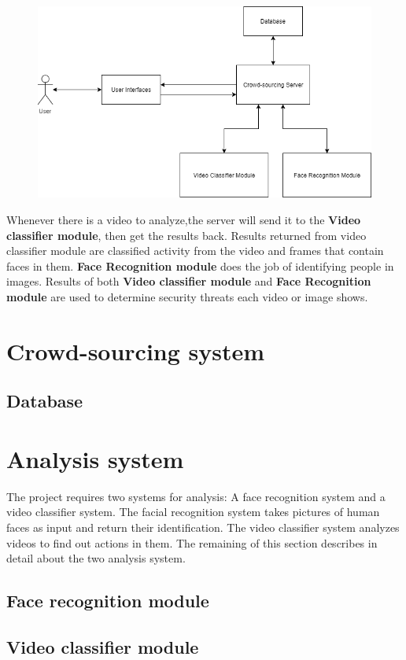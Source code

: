 \begin{center}
    \begin{figure}[H]
    \centering
    \includegraphics[width=1\columnwidth]{images/chap3/system_overview_basic.png}
    \label{chap3:system_overview_basic}
    \end{figure}
\end{center}
Whenever there is a video to analyze,the server will send it to the \textbf{Video classifier module}, then get the results back. Results returned from video classifier module are classified activity from the video and frames that contain faces in them. \textbf{Face Recognition module} does the job of identifying people in images. Results of both \textbf{Video classifier module} and \textbf{Face Recognition module} are used to determine security threats each video or image shows.
\section{Crowd-sourcing system}
\subsection{Database}
\section{Analysis system}
The project requires two systems for analysis: A face recognition system and a video classifier system. The facial recognition system takes pictures of human faces as input and return their identification. The video classifier system analyzes videos to find out actions in them. The remaining of this section describes in detail about the two analysis system.
\subsection{Face recognition module}
\subsection{Video classifier module}

